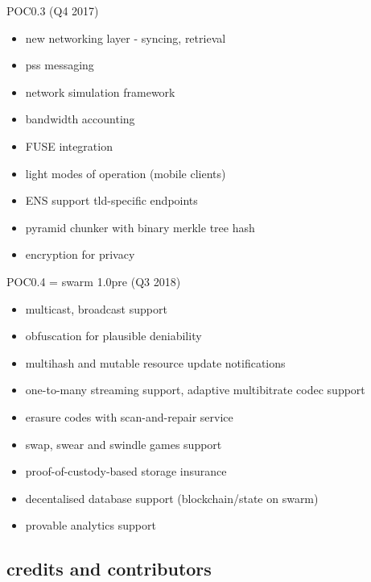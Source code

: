 \documentclass{beamer}
\begin{document}
\begin{frame}
\begin{block}{POC0.3 (Q4 2017)}
 \begin{itemize}
  \item new networking layer - syncing, retrieval
  \item pss messaging
  \item network simulation framework
  \item bandwidth accounting
  \item FUSE integration
  \item light modes of operation (mobile clients)
  \item ENS support tld-specific endpoints
  \item pyramid chunker with binary merkle tree hash
  \item encryption for privacy
 \end{itemize}
\end{block}
\end{frame}

\begin{frame}
\begin{block}{POC0.4 = swarm 1.0pre (Q3 2018)}
 \begin{itemize}
  \item multicast, broadcast support
  \item obfuscation for plausible deniability
  \item multihash and mutable resource update notifications
  \item one-to-many streaming support, adaptive multibitrate codec support
  \item erasure codes with scan-and-repair service
  \item swap, swear and swindle games support
  \item proof-of-custody-based storage insurance
  \item decentalised database support (blockchain/state on swarm)
  \item provable analytics support
 \end{itemize}
\end{block}
\end{frame}

\subsection[credits]{credits and contributors}
\end{document}
